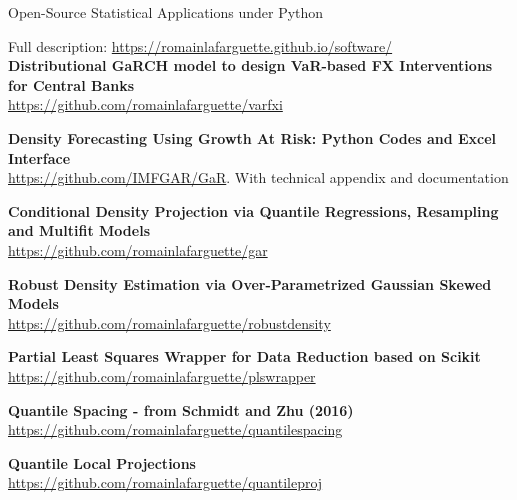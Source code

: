 \documentclass[usegeometry, 10pt, a4paper]{cv} %
\newcommand{\activite}[1]{\textbf{#1}\ }
\begin{document}
\begin{rubriquetableau}[0.95\textwidth]{Open-Source Statistical Applications under Python}\\
  \vspace{-0.5cm}
  
Full description: \url{https://romainlafarguette.github.io/software/}\\

\small
\activite{Distributional GaRCH model to design VaR-based FX Interventions for Central Banks} \\
\hspace{0.6cm} \small{\url{https://github.com/romainlafarguette/varfxi}}
\vspace{0.4cm} 

\small
\activite{Density Forecasting Using Growth At Risk: Python Codes and Excel Interface} \\
\hspace{0.6cm} \small{\url{https://github.com/IMFGAR/GaR}. With technical
  appendix and documentation}
\vspace{0.4cm} 

\small
\activite{Conditional Density Projection via Quantile Regressions, Resampling and Multifit Models} \\
\hspace{0.6cm} \small{\url{https://github.com/romainlafarguette/gar}}
\vspace{0.4cm} 

\small
\activite{Robust Density Estimation via Over-Parametrized Gaussian Skewed Models} \\
\hspace{0.6cm} \small{\url{https://github.com/romainlafarguette/robustdensity}}
\vspace{0.4cm} 

\small
\activite{Partial Least Squares Wrapper for Data Reduction based on Scikit} \\
\hspace{0.6cm} \small{\url{https://github.com/romainlafarguette/plswrapper}}
\vspace{0.4cm} 

\small
\activite{Quantile Spacing - from Schmidt and Zhu (2016)} \\
\hspace{0.6cm} \small{\url{https://github.com/romainlafarguette/quantilespacing}}
\vspace{0.4cm} 

\small
\activite{Quantile Local Projections} \\
\hspace{0.6cm} \small{\url{https://github.com/romainlafarguette/quantileproj}}
\vspace{0.4cm} 


\end{rubriquetableau}
\end{document}
